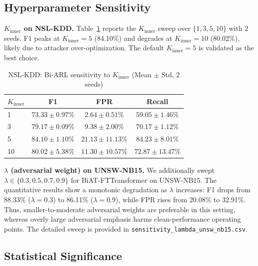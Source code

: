 \subsection{Hyperparameter Sensitivity}
\label{sec:hyperparam}

\textbf{$K_{\text{inner}}$ on NSL-KDD.}
Table~\ref{tab:sensitivity_kinner} reports the $K_{\text{inner}}$ sweep over $\{1, 3, 5, 10\}$ with 2 seeds. F1 peaks at $K_{\text{inner}} = 5$ (84.10\%) and degrades at $K_{\text{inner}} = 10$ (80.02\%), likely due to attacker over-optimization. The default $K_{\text{inner}} = 5$ is validated as the best choice.

\begin{table}[h]
    \centering
    \caption{NSL-KDD: Bi-ARL sensitivity to $K_{\text{inner}}$ (Mean $\pm$ Std, 2 seeds)}
    \label{tab:sensitivity_kinner}
    \begin{tabular}{lccc}
        \toprule
        $K_{\text{inner}}$ & \textbf{F1} & \textbf{FPR} & \textbf{Recall} \\
        \midrule
        1  & $73.33{\pm}0.97$\% & $2.64{\pm}0.51$\%  & $59.05{\pm}1.46$\% \\
        3  & $79.17{\pm}0.09$\% & $9.38{\pm}2.00$\%  & $70.17{\pm}1.12$\% \\
        5  & $\mathbf{84.10{\pm}1.10}$\% & $21.13{\pm}11.13$\% & $84.23{\pm}8.01$\% \\
        10 & $80.02{\pm}5.38$\% & $11.30{\pm}10.57$\% & $72.87{\pm}13.47$\% \\
        \bottomrule
    \end{tabular}
\end{table}

\textbf{$\lambda$ (adversarial weight) on UNSW-NB15.}
We additionally swept $\lambda \in \{0.3, 0.5, 0.7, 0.9\}$ for BiAT-FTTransformer on UNSW-NB15. The quantitative results show a monotonic degradation as $\lambda$ increases: F1 drops from 88.33\% ($\lambda=0.3$) to 86.11\% ($\lambda=0.9$), while FPR rises from 20.08\% to 32.91\%. Thus, smaller-to-moderate adversarial weights are preferable in this setting, whereas overly large adversarial emphasis harms clean-performance operating points. The detailed sweep is provided in \texttt{sensitivity\_lambda\_unsw\_nb15.csv}.

\subsection{Statistical Significance}
\label{sec:significance}

